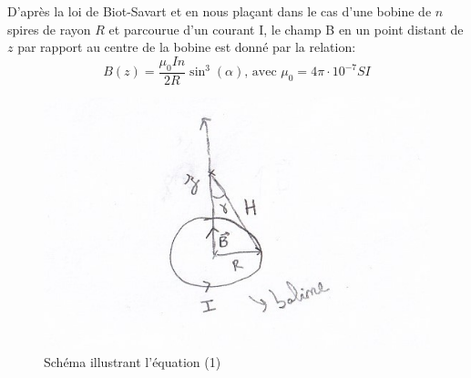 \documentclass[12pt,a4paper]{article}
\begin{document}
D'après la loi de Biot-Savart et en nous plaçant dans le cas d'une bobine de $n$ spires de rayon $R$ et parcourue d'un courant I, le champ B en un point distant de $z$ par rapport au centre de la bobine est donné par la relation:
\begin{equation}
B(z) = \frac{\mu_{0}In}{2R}\sin^3(\alpha) \text{, avec $\mu_0 = 4\pi\cdot10^{-7} SI$}
\end{equation}
\begin{figure}[H]
\centering
\includegraphics[scale=1]{s1.jpg}
\caption{Schéma illustrant l'équation (1)}

\end{figure}
\end{document}
